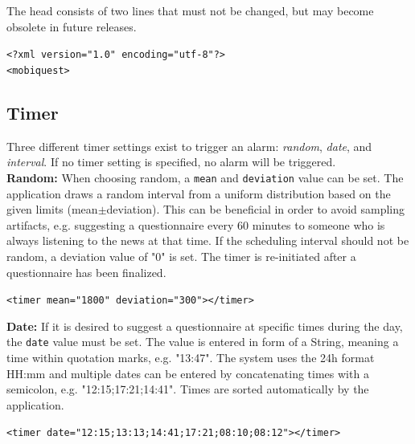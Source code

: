 \documentclass[11pt,a4paper,titlepage]{article}
\begin{document}
The head consists of two lines that must not be changed, but may become obsolete in future releases.

\begin{center}
\begin{tcolorbox}[colback=black!10!white,colframe=black!50!white, boxsep=1pt,left=4pt,right=4pt,top=4pt,bottom=2pt]
\texttt{<?xml version="1.0" encoding="utf-8"?>\\
<mobiquest>}
\end{tcolorbox}
\end{center}


\subsection{Timer}

Three different timer settings exist to trigger an alarm: \textit{random}, \textit{date}, and \textit{interval}. If no timer setting is specified, no alarm will be triggered.\\

\textbf{Random:} When choosing random, a \texttt{mean} and \texttt{deviation} value can be set. The application draws a random interval from a uniform distribution based on the given limits (mean$\pm$deviation). This can be beneficial in order to avoid sampling artifacts, e.g. suggesting a questionnaire every 60 minutes to someone who is always listening to the news at that time. If the scheduling interval should not be random, a deviation value of "0" is set. The timer is re-initiated after a questionnaire has been finalized.

\begin{center}
\begin{tcolorbox}[colback=black!10!white,colframe=black!50!white, boxsep=1pt,left=4pt,right=4pt,top=4pt,bottom=2pt]
\texttt{<timer mean="1800" deviation="300"></timer>}
\end{tcolorbox}
\end{center}

\textbf{Date:} If it is desired to suggest a questionnaire at specific times during the day, the \texttt{date} value must be set. The value is entered in form of a String, meaning a time within quotation marks, e.g. "13:47". The system uses the 24h format HH:mm and multiple dates can be entered by concatenating times with a semicolon, e.g. "12:15;17:21;14:41". Times are sorted automatically by the application. 

\begin{center}
\begin{tcolorbox}[colback=black!10!white,colframe=black!50!white, boxsep=1pt,left=4pt,right=4pt,top=4pt,bottom=2pt]
\texttt{<timer date="12:15;13:13;14:41;17:21;08:10;08:12"></timer>}
\end{tcolorbox}
\end{center}
\end{document}
